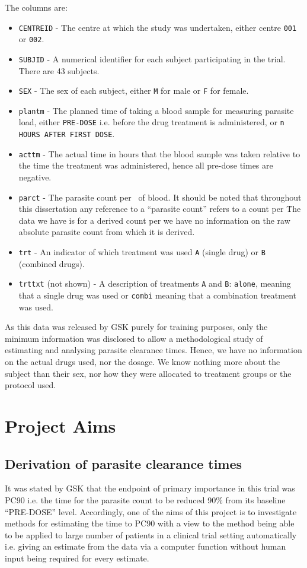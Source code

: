 The columns are:
\begin{itemize}
\item\texttt{CENTREID} - The centre at which the study was undertaken, either centre \texttt{001} or \texttt{002}.
\item\texttt{SUBJID} - A numerical identifier for each subject participating in the trial. There are 43 subjects.
\item\texttt{SEX} - The sex of each subject, either \texttt{M} for male or \texttt{F} for female.
\item\texttt{plantm} - The planned time of taking a blood sample for measuring parasite load, either \texttt{PRE-DOSE} i.e. before the drug treatment is administered, or \texttt{n HOURS AFTER FIRST DOSE}.
\item\texttt{acttm} - The actual time in hours that the blood sample was taken relative to the time the treatment was administered, hence all pre-dose times are negative.
\item\texttt{parct} - The parasite count per \micro\liter\ of blood. It should be noted that throughout this dissertation any reference to a ``parasite count'' refers to a count per \micro\liter\. The data we have is for a derived count per \micro\liter\; we have no information on the raw absolute parasite count from which it is derived.
\item\texttt{trt} - An indicator of which treatment was used \texttt{A} (single drug) or \texttt{B} (combined drugs).
\item\texttt{trttxt} (not shown) - A description of treatments \texttt{A} and \texttt{B}: \texttt{alone}, meaning that a single drug was used or \texttt{combi} meaning that a combination treatment was used.
\end{itemize}

As this data was released by GSK purely for training purposes, only the minimum information was disclosed to allow a methodological study of estimating and analysing parasite clearance times. Hence, we have no information on the actual drugs used, nor the dosage. We know nothing more about the subject than their sex, nor how they were allocated to treatment groups or the protocol used.

\section{Project Aims}
\subsection{Derivation of parasite clearance times}
It was stated by GSK that the endpoint of primary importance in this trial was PC90 i.e. the time for the parasite count to be reduced 90\% from its baseline ``PRE-DOSE'' level. Accordingly, one of the aims of this project is to investigate methods for estimating the time to PC90 with a view to the method being able to be applied to large number of patients in a clinical trial setting automatically i.e. giving an estimate from the data via a computer function without human input being required for every estimate.

